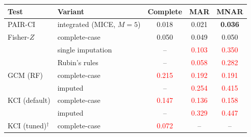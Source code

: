 \begin{tabular}{llccc}
    \toprule
    Test & Variant & Complete & MAR & MNAR \\
    \midrule
    PAIR-CI        & integrated (MICE, $M{=}5$)   & 0.018 & 0.021 & \textbf{0.036} \\
    \midrule
    Fisher-$Z$     & complete-case                & 0.050 & 0.049 & 0.050 \\
                   & single imputation            & -- & \textcolor{red}{0.103} & \textcolor{red}{0.350} \\
                   & Rubin's rules                & -- & \textcolor{red}{0.058} & \textcolor{red}{0.282} \\
    \midrule
    GCM (RF)       & complete-case                & \textcolor{red}{0.215} & \textcolor{red}{0.192} & \textcolor{red}{0.191} \\
                   & imputed                      & -- & \textcolor{red}{0.254} & \textcolor{red}{0.415} \\
    \midrule
    KCI (default)  & complete-case                & \textcolor{red}{0.147} & \textcolor{red}{0.136} & \textcolor{red}{0.158} \\
                   & imputed                      & -- & \textcolor{red}{0.329} & \textcolor{red}{0.447} \\
    KCI (tuned)$^\dagger$ & complete-case & \textcolor{red}{0.072} & -- & -- \\
    \bottomrule
\end{tabular}
